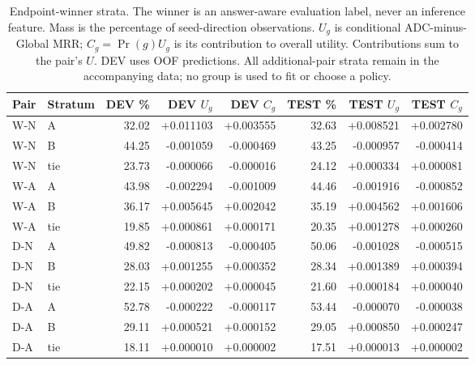 \begin{table}[htbp]
\centering\footnotesize\setlength{\tabcolsep}{3pt}
\caption{Endpoint-winner strata. The winner is an answer-aware evaluation label, never an inference feature. Mass is the percentage of seed-direction observations. $U_g$ is conditional ADC-minus-Global MRR; $C_g=\Pr(g)U_g$ is its contribution to overall utility. Contributions sum to the pair's $U$. DEV uses OOF predictions. All additional-pair strata remain in the accompanying data; no group is used to fit or choose a policy.}
\label{tab:complement-winners}
\begin{tabular}{llrrrrrr}
\toprule
Pair & Stratum & DEV \% & DEV $U_g$ & DEV $C_g$ & TEST \% & TEST $U_g$ & TEST $C_g$\\
\midrule
W-N & A & 32.02 & +0.011103 & +0.003555 & 32.63 & +0.008521 & +0.002780\\[2pt]
W-N & B & 44.25 & -0.001059 & -0.000469 & 43.25 & -0.000957 & -0.000414\\[2pt]
W-N & tie & 23.73 & -0.000066 & -0.000016 & 24.12 & +0.000334 & +0.000081\\[2pt]
\midrule
W-A & A & 43.98 & -0.002294 & -0.001009 & 44.46 & -0.001916 & -0.000852\\[2pt]
W-A & B & 36.17 & +0.005645 & +0.002042 & 35.19 & +0.004562 & +0.001606\\[2pt]
W-A & tie & 19.85 & +0.000861 & +0.000171 & 20.35 & +0.001278 & +0.000260\\[2pt]
\midrule
D-N & A & 49.82 & -0.000813 & -0.000405 & 50.06 & -0.001028 & -0.000515\\[2pt]
D-N & B & 28.03 & +0.001255 & +0.000352 & 28.34 & +0.001389 & +0.000394\\[2pt]
D-N & tie & 22.15 & +0.000202 & +0.000045 & 21.60 & +0.000184 & +0.000040\\[2pt]
\midrule
D-A & A & 52.78 & -0.000222 & -0.000117 & 53.44 & -0.000070 & -0.000038\\[2pt]
D-A & B & 29.11 & +0.000521 & +0.000152 & 29.05 & +0.000850 & +0.000247\\[2pt]
D-A & tie & 18.11 & +0.000010 & +0.000002 & 17.51 & +0.000013 & +0.000002\\[2pt]
\bottomrule
\end{tabular}
\end{table}
